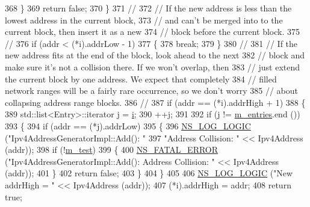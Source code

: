 \begin{DoxyCode}
368             \}
369           \textcolor{keywordflow}{return} \textcolor{keyword}{false};
370         \}
371 \textcolor{comment}{//}
372 \textcolor{comment}{// If the new address is less than the lowest address in the current block,}
373 \textcolor{comment}{// and can't be merged into to the current block, then insert it as a new}
374 \textcolor{comment}{// block before the current block.}
375 \textcolor{comment}{//}
376       \textcolor{keywordflow}{if} (addr < (*i).addrLow - 1)
377         \{
378           \textcolor{keywordflow}{break};
379         \}
380 \textcolor{comment}{//}
381 \textcolor{comment}{// If the new address fits at the end of the block, look ahead to the next }
382 \textcolor{comment}{// block and make sure it's not a collision there.  If we won't overlap, then}
383 \textcolor{comment}{// just extend the current block by one address.  We expect that completely}
384 \textcolor{comment}{// filled network ranges will be a fairly rare occurrence, so we don't worry}
385 \textcolor{comment}{// about collapsing address range blocks.}
386 \textcolor{comment}{// }
387       \textcolor{keywordflow}{if} (addr == (*i).addrHigh + 1)
388         \{
389           std::list<Entry>::iterator j = \hyperlink{bernuolliDistribution_8m_a6f6ccfcf58b31cb6412107d9d5281426}{i};
390           ++j;
391 
392           \textcolor{keywordflow}{if} (j != \hyperlink{classns3_1_1Ipv4AddressGeneratorImpl_aa038cfd5736c3d67f5433c3a2aa20cbf}{m\_entries}.end ())
393             \{
394               \textcolor{keywordflow}{if} (addr == (*j).addrLow)
395                 \{
396                   \hyperlink{group__logging_ga88acd260151caf2db9c0fc84997f45ce}{NS\_LOG\_LOGIC} (\textcolor{stringliteral}{"Ipv4AddressGeneratorImpl::Add(): "}
397                                 \textcolor{stringliteral}{"Address Collision: "} << Ipv4Address (addr));
398                   \textcolor{keywordflow}{if} (!\hyperlink{classns3_1_1Ipv4AddressGeneratorImpl_ae80732b27ea2032ba783dce3f92d264b}{m\_test})
399                     \{
400                       \hyperlink{group__fatal_ga5131d5e3f75d7d4cbfd706ac456fdc85}{NS\_FATAL\_ERROR} (\textcolor{stringliteral}{"Ipv4AddressGeneratorImpl::Add(): Address Collision: "} 
      << Ipv4Address (addr));
401                     \}
402                   \textcolor{keywordflow}{return} \textcolor{keyword}{false};
403                 \}
404             \}
405 
406           \hyperlink{group__logging_ga88acd260151caf2db9c0fc84997f45ce}{NS\_LOG\_LOGIC} (\textcolor{stringliteral}{"New addrHigh = "} << Ipv4Address (addr));
407           (*i).addrHigh = addr;
408           \textcolor{keywordflow}{return} \textcolor{keyword}{true};

\end{DoxyCode}

